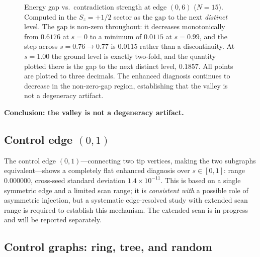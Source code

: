 \documentclass[aps,prb,reprint,superscriptaddress]{revtex4-2}
\begin{document}
\begin{figure}[t]
\centering
{}
\caption{Energy gap vs.\ contradiction strength at edge $(0,6)$ ($N=15$). Computed in the $S_z=+1/2$ sector as the gap to the next \emph{distinct} level. The gap is non-zero throughout: it decreases monotonically from $0.6176$ at $s=0$ to a minimum of $0.0115$ at $s=0.99$, and the step across $s=0.76\to0.77$ is $0.0115$ rather than a discontinuity. At $s=1.00$ the ground level is exactly two-fold, and the quantity plotted there is the gap to the next distinct level, $0.1857$. All points are plotted to three decimals. The enhanced diagnosis continues to decrease in the non-zero-gap region, establishing that the valley is not a degeneracy artifact.}
\label{fig:gap}
\end{figure}

\textbf{Conclusion: the valley is not a degeneracy artifact.}

\subsection{Control edge $(0,1)$}

The control edge $(0,1)$---connecting two tip vertices, making the two subgraphs equivalent---shows a completely flat enhanced diagnosis over $s\in[0,1]$: range $0.000000$, cross-seed standard deviation $1.4\times10^{-11}$. This is based on a single symmetric edge and a limited scan range; it is \emph{consistent with} a possible role of asymmetric injection, but a systematic edge-resolved study with extended scan range is required to establish this mechanism. The extended scan is in progress and will be reported separately.

\subsection{Control graphs: ring, tree, and random}
\end{document}

